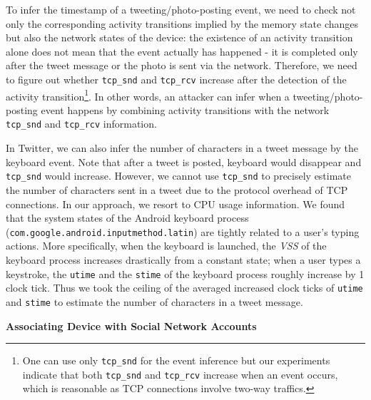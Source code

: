 \documentclass[letterpaper,12pt]{article}
\begin{document}
To infer the timestamp of a tweeting/photo-posting event, we need to check not only the corresponding activity transitions implied by the memory state changes but also the network states of the device: the existence of an activity transition alone does not mean that the event actually has happened - it is completed only after the tweet message or the photo is sent via the network. Therefore, we need to figure out whether \texttt{tcp\_snd} and \texttt{tcp\_rcv} increase after the detection of the activity transition\footnote{One can use only \texttt{tcp\_snd} for the event inference but our experiments indicate that both \texttt{tcp\_snd} and \texttt{tcp\_rcv} increase when an event occurs, which is reasonable as TCP connections involve two-way traffics.}. In other words, an attacker can infer when a tweeting/photo-posting event happens by combining activity transitions with the network \texttt{tcp\_snd} and \texttt{tcp\_rcv} information. 

In Twitter, we can also infer the number of characters in a tweet message by the keyboard event. Note that after a tweet is posted, keyboard would disappear and \texttt{tcp\_snd} would increase. However, we cannot use \texttt{tcp\_snd} to precisely estimate the number of characters sent in a tweet due to the protocol overhead of TCP connections. In our approach, we resort to CPU usage information. We found that the system states of the Android keyboard process (\texttt{com.google.android.inputmethod.latin}) are tightly related to a user's typing actions. More specifically, when the keyboard is launched, the \emph{VSS} of the keyboard process increases drastically from a constant state; when a user types a keystroke, the \texttt{utime} and the \texttt{stime} of the keyboard process roughly increase by 1 clock tick. Thus we took the ceiling of the averaged increased clock ticks of \texttt{utime} and \texttt{stime} to estimate the number of characters in a tweet message. %

\textbf{Associating Device with Social Network Accounts}
\end{document}
